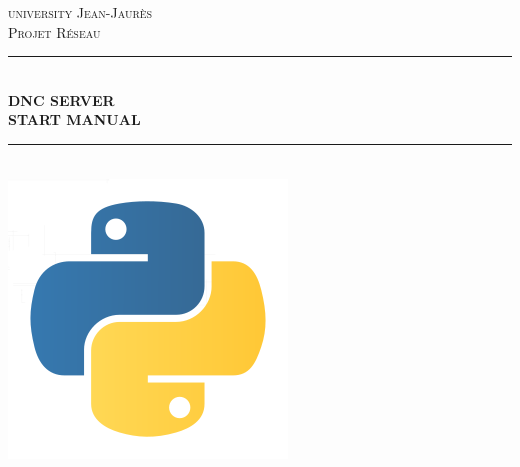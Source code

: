\documentclass[12pt]{article}
\begin{document}
\newcommand{\HRule}{\rule{\linewidth}{0.5mm}} %

\center %
 

\textsc{\LARGE university Jean-Jaur\`{e}s}\\[1.5cm] %
\textsc{\large Projet Réseau }\\[0.5cm] %



\HRule \\[0.4cm]
{ \huge \bfseries DNC SERVER \\ START MANUAL}\\[0.4cm] %
\HRule \\[1.5cm]

\includegraphics[scale=0.25]{logo.png}\\[1cm] %
 

\end{document}
